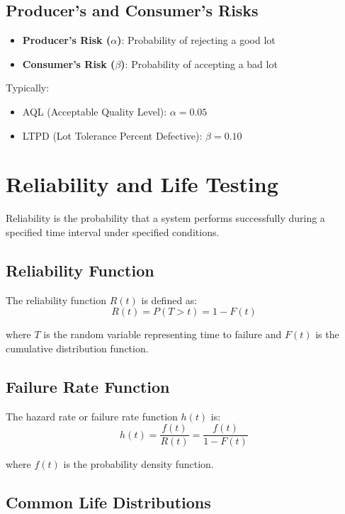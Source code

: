 \documentclass[twoside]{book}
\begin{document}
\subsection{Producer's and Consumer's Risks}

\begin{itemize}
    \item \textbf{Producer's Risk ($\alpha$)}: Probability of rejecting a good lot
    \item \textbf{Consumer's Risk ($\beta$)}: Probability of accepting a bad lot
\end{itemize}

Typically:
\begin{itemize}
    \item AQL (Acceptable Quality Level): $\alpha = 0.05$
    \item LTPD (Lot Tolerance Percent Defective): $\beta = 0.10$
\end{itemize}

\section{Reliability and Life Testing}

Reliability is the probability that a system performs successfully during a specified time interval under specified conditions.

\subsection{Reliability Function}

The reliability function $R(t)$ is defined as:
$$R(t) = P(T > t) = 1 - F(t)$$

where $T$ is the random variable representing time to failure and $F(t)$ is the cumulative distribution function.

\subsection{Failure Rate Function}

The hazard rate or failure rate function $h(t)$ is:
$$h(t) = \frac{f(t)}{R(t)} = \frac{f(t)}{1-F(t)}$$

where $f(t)$ is the probability density function.

\subsection{Common Life Distributions}
\end{document}

